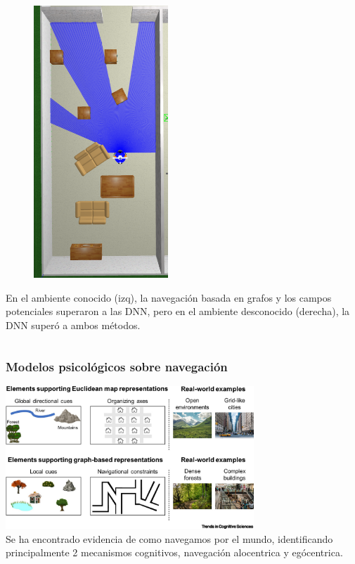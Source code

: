 \begin{frame}
\begin{columns}
\begin{column}{0.35\textwidth}
\begin{figure}
        \includegraphics[width=0.45\textwidth]{Figures/MotionPlanning/Ambiente2.png}
      \end{figure}
      En el ambiente conocido (izq), la navegación basada en grafos y los campos potenciales superaron a las DNN, pero en el ambiente desconocido (derecha), la DNN superó a ambos métodos. 
    \end{column}
  \end{columns}
\end{frame}

\begin{frame}\frametitle{Modelos psicológicos sobre navegación}
  \includegraphics[width=0.7\textwidth]{Figures/FPNavigation1.jpg}\\
  Se ha encontrado evidencia de como navegamos por el mundo, identificando principalmente 2 mecanismos cognitivos, navegación alocentrica y egócentrica.
\end{frame}

